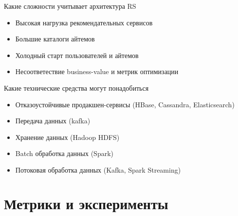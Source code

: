 \documentclass[11pt,aspectratio=169,handout]{beamer}
\begin{document}
\begin{frame}{Какие сложности учитывает архитектура RS}

\begin{itemize}
\item Высокая нагрузка рекомендательных сервисов
\item Большие каталоги айтемов
\item Холодный старт пользователей и айтемов
\item Несоответествие business-value и метрик оптимизации
\end{itemize}

\end{frame}

\begin{frame}{Какие технические средства могут понадобиться}

\begin{itemize}
\item Отказоустойчивые продакшен-сервисы (HBase, Cassandra, Elasticsearch)
\item Передача данных (kafka)
\item Хранение данных (Hadoop HDFS)
\item Batch обработка данных (Spark)
\item Потоковая обработка данных (Kafka, Spark Streaming)
\end{itemize}

\end{frame}

\section{Метрики и эксперименты}
\end{document}
